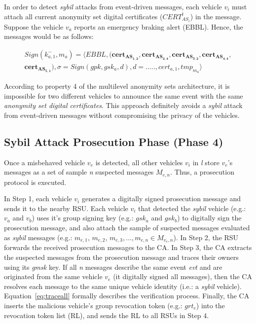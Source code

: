 \documentclass[preprint,12pt]{elsarticle}
\begin{document}
In order to detect \textit{sybil} attacks from event-driven messages, each vehicle $v_{i}$ must attach all current anonymity set digital certificates ($CERT^{t}_{AS_{i}}$) in the message. Suppose the vehicle $v_{a}$ reports an emergency braking alert (EBBL). Hence, the messages would be as follows:  

\begin{equation*}
\begin{split}
Sign(k^{-}_{a,1}, m_a)= \langle EBBL, (\boldsymbol{cert_{AS_{1,2}}}, \boldsymbol{cert_{AS_{2,4}}}, \boldsymbol{cert_{AS_{3,2}}}, \boldsymbol{cert_{AS_{4,4}}}, \\
\boldsymbol{cert_{AS_{5,1}}}), \sigma = Sign(gpk, gsk_{a}, d), d = ....., cert_{a, 1}, tmp_{m_a
} \rangle
\end{split}
\end{equation*}
 
According to property 4 of the multilevel anonymity sets architecture, it is impossible for two different vehicles to announce the same event with the same \textit{anonymity set digital certificates}. This approach definitely avoids a \textit{sybil} attack from event-driven messages without compromising the privacy of the vehicles.

\subsection{Sybil Attack Prosecution Phase (Phase 4)}
\label{sec:phase4}

Once a misbehaved vehicle $v_{e}$ is detected, all other vehicles $v_{i}$ in \textit{l} store $v_{e}$'s messages as a set of sample \textit{n} suspected messages $M_{e, n}$. Thus, a prosecution protocol is executed.

In Step 1, each vehicle $v_{i}$ generates a digitally signed prosecution message and sends it to the nearby RSU. Each vehicle $v_{i}$ that detected the \textit{sybil} vehicle (e.g.: $v_{a}$ and $v_{b}$) uses it's group signing key (e.g.: $gsk_{a}$ and $gsk_{b}$) to digitally sign the prosecution message, and also attach the sample of suspected messages evaluated as \textit{sybil} messages (e.g.: $m_{e, 1}$, $m_{e, 2}$, $m_{e, 3}, ..., m_{e, n} \in M_{v_{e}, n}$). In Step 2, the RSU forwards the received prosecution messages to the CA. In Step 3, the CA extracts the suspected messages from the prosecution message and traces their owners using its \textit{gmsk} key. If all \textit{n} messages describe the same event \textit{evt} and are originated from the same vehicle $v_{e}$ (it digitally signed all messages), then the CA resolves each message to the same unique vehicle identity (i.e.: a \textit{sybil} vehicle). Equation~\ref{eq:traceall} formally describes the verification process. Finally, the CA inserts the malicious vehicle's group revocation token (e.g.: $grt_{e}$) into the revocation token list (RL), and sends the RL to all RSUs in Step 4.
%
\end{document}
